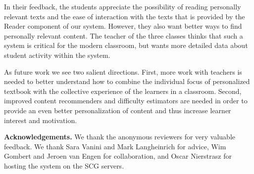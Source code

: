 In their feedback, the students appreciate the possibility of reading personally relevant texts and the ease of interaction with the texts that is provided by the Reader component of our system. However, they also want better ways to find personally relevant content. The teacher of the three classes thinks that such a system is critical for the modern classroom, but wants more detailed data about student activity within the system.

As future work we see two salient directions. First, more work with teachers is needed to better understand how to combine the individual focus of personalized textbook with the collective experience of the learners in a classroom.
Second, improved content recommenders and difficulty estimators are needed in order to provide an even better personalization of content and thus increase learner interest and motivation.



{\footnotesize
	{\bf Acknowledgements.} We thank the anonymous reviewers for very valuable feedback. We thank Sara Vanini and Mark Langheinrich for advice, 
	 Wim Gombert and Jeroen van Engen for collaboration,
	 and Oscar Nierstrasz for hosting the system on the SCG servers.
}